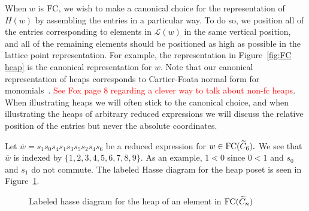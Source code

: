 When $w$ is $\mathrm{FC}$, we wish to make a canonical choice for the representation of $H(w)$ by assembling the entries in a particular way. To do so, we position all of the entries corresponding to elements in $\mathcal{L}(w)$ in the same vertical position, and all of the remaining elements should be positioned as high as possible in the lattice point representation. For example, the representation in Figure~\ref{fig:FC heap} is the canonical representation for $w$. Note that our canonical representation of heaps corresponds to Cartier-Foata normal form for monomials~\cite{Cartier1969, Green2006a}. \textcolor{red}{See Fox page 8 regarding a clever way to talk about non-fc heaps}. When illustrating heaps we will often stick to the canonical choice, and when illustrating the heaps of arbitrary reduced expressions we will discuss the relative position of the entries but never the absolute coordinates. 

\begin{example}
Let $\overline{w}=s_1s_0s_4s_1s_3s_5s_2s_4s_6$ be a reduced expression for $w \in \mathrm{FC}(\widetilde{C}_6).$ We see that $\overline{w}$ is indexed by $\{1,2,3,4,5,6,7,8,9\}$. As an example, $1 \lessdot 0$ since $0 <1$ and $s_0$ and $s_1$ do not commute. The labeled Hasse diagram for the heap poset is seen in Figure~\ref{fig:Hasse}.
\begin{figure}[h]
\centering
{}
\caption{Labeled hasse diagram for the heap of an element in $\mathrm{FC}(\widetilde{C}_n)$}
\label{fig:Hasse}	
\end{figure}
\end{example}

